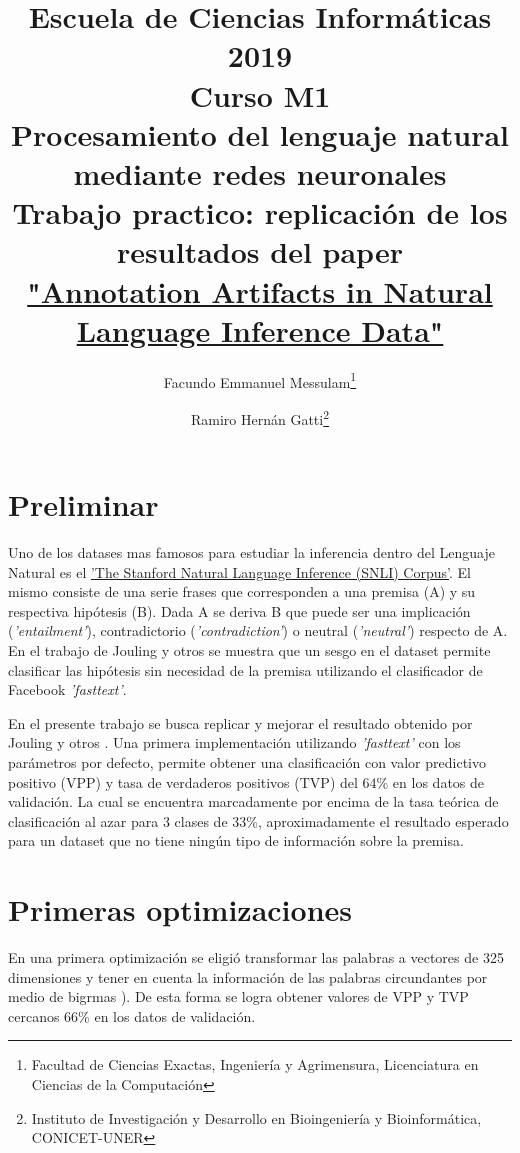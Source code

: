 \documentclass{article}
\title{Escuela de Ciencias Informáticas 2019\\
	{\small{Curso M1}}\\
	Procesamiento del lenguaje natural mediante redes neuronales\\
	{\small{Trabajo practico: replicación de los resultados del paper}}\\
	\href{https://www.aclweb.org/anthology/N18-2017}{"Annotation Artifacts in Natural Language Inference Data"}}
\author{Facundo Emmanuel Messulam\footnote{Facultad de Ciencias Exactas, Ingeniería y Agrimensura, Licenciatura en Ciencias de la Computación}
	\and
	Ramiro Hernán Gatti\footnote{Instituto de Investigación y Desarrollo en Bioingeniería y Bioinformática, CONICET-UNER}}
\begin{document}
    \begin{titlepage}
        \maketitle
        \thispagestyle{empty}
    \end{titlepage}
	
	\section*{Preliminar}
	Uno de los datases mas famosos para estudiar la inferencia dentro del Lenguaje Natural es el \href{https://nlp.stanford.edu/projects/snli/}{'The Stanford Natural Language Inference (SNLI) Corpus'}. El mismo consiste de una serie frases que corresponden a una premisa (A) y su respectiva hipótesis (B). Dada A se deriva B que puede ser una implicación (\textit{'entailment'}), contradictorio (\textit{'contradiction'}) o neutral  (\textit{'neutral'}) respecto de A. En el trabajo de Jouling y otros \cite{joulin2017bag} se muestra que un sesgo en el dataset permite clasificar las hipótesis sin necesidad de la premisa utilizando el clasificador de Facebook \textit{'fasttext'}. 
	
	En el presente trabajo se busca replicar y mejorar el resultado obtenido por Jouling y otros \cite{joulin2017bag}. Una primera implementación utilizando \textit{'fasttext'} con los parámetros por defecto, permite obtener una clasificación con valor predictivo positivo (VPP) y tasa de verdaderos positivos (TVP) del 64\% en los datos de validación. La cual se encuentra marcadamente por encima de la tasa teórica de clasificación al azar para 3 clases de 33\%, aproximadamente el resultado esperado para un dataset que no tiene ningún tipo de información sobre la premisa.
	
	\section*{Primeras optimizaciones}
	En una primera optimización se eligió transformar las palabras a vectores de 325 dimensiones y tener en cuenta la información de las palabras circundantes por medio de bigrmas \cite{bigrams}). De esta forma se logra obtener valores de VPP y TVP cercanos 66\% en los datos de validación.
	
\end{document}
